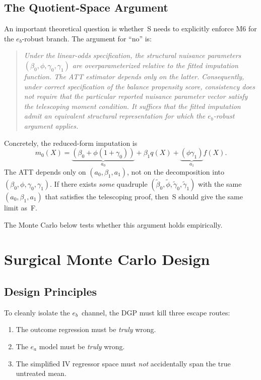 \documentclass[11pt,letterpaper]{article}
\begin{document}
\subsection{The Quotient-Space Argument}

An important theoretical question is whether~S needs to explicitly
enforce M6 for the $e_b$-robust branch.  The argument for ``no'' is:

\begin{quote}
\itshape
Under the linear-odds specification, the structural nuisance
parameters $(\beta_0, \phi, \gamma_0, \gamma_1)$ are
overparameterized relative to the fitted imputation function.
The ATT estimator depends only on the latter.  Consequently,
under correct specification of the balance propensity score,
consistency does not require that the particular reported nuisance
parameter vector satisfy the telescoping moment condition.  It
suffices that the fitted imputation admit an equivalent structural
representation for which the $e_b$-robust argument applies.
\end{quote}

\noindent
Concretely, the reduced-form imputation is
\[
  m_0(X) = \underbrace{(\beta_0 + \phi(1+\gamma_0))}_{a_0}
           + \beta_1 q(X)
           + \underbrace{(\phi\gamma_1)}_{a_1} f(X).
\]
The ATT depends only on $(a_0, \beta_1, a_1)$, not on the
decomposition into $(\beta_0, \phi, \gamma_0, \gamma_1)$.  If
there exists \emph{some} quadruple
$(\tilde\beta_0, \tilde\phi, \tilde\gamma_0, \tilde\gamma_1)$
with the same $(a_0, \beta_1, a_1)$ that satisfies the
telescoping proof, then~S should give the same limit as~F.

The Monte Carlo below tests whether this argument holds
empirically.

\section{Surgical Monte Carlo Design}

\subsection{Design Principles}

To cleanly isolate the $e_b$~channel, the DGP must kill three
escape routes:
\begin{enumerate}[nosep]
  \item The outcome regression must be \emph{truly} wrong.
  \item The $e_a$ model must be \emph{truly} wrong.
  \item The simplified IV regressor space must \emph{not} accidentally
    span the true untreated mean.
\end{enumerate}
\end{document}
